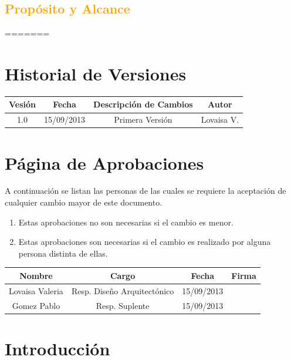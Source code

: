 \subsection{\textcolor{orange}{Propósito y Alcance}}
=======
\section{\textcolor[gray]{.2}{Historial de Versiones}}
\begin{table}[!h]
\begin{center}
\begin{tabular}{|c|c|c|c|}
\hline
\rowcolor[gray]{.8} Vesión & Fecha & Descripción de Cambios & Autor\\
\hline
1.0 & 15/09/2013 & Primera Versión & Lovaisa V.\\
\hline
\end{tabular}
\end{center}
\end{table}
\newpage

\section{\textcolor[gray]{.2}{Página de Aprobaciones}}
A continuación se listan las personas de las cuales se requiere la aceptación de
cualquier cambio mayor de este documento.
\begin{enumerate}
  \item Estas aprobaciones no son necesarias si el cambio es menor.
  \item Estas aprobaciones son necesarias si el cambio es realizado por alguna
  persona distinta de ellas.
\end{enumerate}
\begin{table}[!h]
\begin{center}
\begin{tabular}{|c|c|c|c|}
\hline
\rowcolor[gray]{.8} Nombre & Cargo & Fecha & Firma\\
\hline
Lovaisa Valeria & Resp. Diseño Arquitectónico & 15/09/2013 & \\
\hline
Gomez Pablo & Resp. Suplente & 15/09/2013 & \\
\hline
\end{tabular}
\end{center}
\end{table}

\newpage
\section{\textcolor[gray]{.2}{Introducción}}
